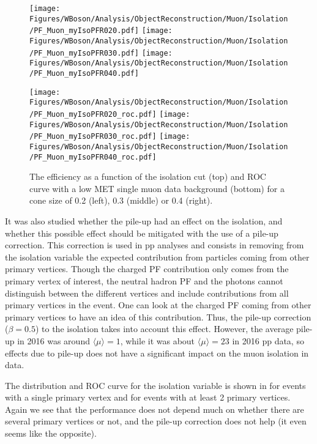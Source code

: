 \begin{figure}[htbp]
 
 \begin{center}
 \texttt{[image: Figures/WBoson/Analysis/ObjectReconstruction/Muon/Isolation/PF\_Muon\_myIsoPFR020.pdf]}
 \texttt{[image: Figures/WBoson/Analysis/ObjectReconstruction/Muon/Isolation/PF\_Muon\_myIsoPFR030.pdf]}
 \texttt{[image: Figures/WBoson/Analysis/ObjectReconstruction/Muon/Isolation/PF\_Muon\_myIsoPFR040.pdf]}
 
 \texttt{[image: Figures/WBoson/Analysis/ObjectReconstruction/Muon/Isolation/PF\_Muon\_myIsoPFR020\_roc.pdf]}
 \texttt{[image: Figures/WBoson/Analysis/ObjectReconstruction/Muon/Isolation/PF\_Muon\_myIsoPFR030\_roc.pdf]}
 \texttt{[image: Figures/WBoson/Analysis/ObjectReconstruction/Muon/Isolation/PF\_Muon\_myIsoPFR040\_roc.pdf]}
 \end{center}
 
 \caption{\label{fig:isoConesLowMET}The efficiency as a function of the isolation cut (top) and ROC curve with a low MET single muon data background (bottom) for a cone size of 0.2 (left), 0.3 (middle) or 0.4 (right).}
\end{figure}

It was also studied whether the pile-up had an effect on the isolation, and whether this possible effect should be mitigated with the use of a pile-up correction. This correction is used in pp analyses and consists in removing from the isolation variable the expected contribution from particles coming from other primary vertices. Though the charged PF contribution only comes from the primary vertex of interest, the neutral hadron PF and the photons cannot distinguish between the different vertices and include contributions from all primary vertices in the event. One can look at the charged PF coming from other primary vertices to have an idea of this contribution. Thus, the pile-up correction ($\beta=0.5$) to the isolation takes into account this effect. However, the average pile-up in 2016 \pPb was around $\langle\mu\rangle = 1$, while it was about $\langle\mu\rangle = 23$ in 2016 pp data, so effects due to pile-up does not have a significant impact on the muon isolation in \pPb data.

The distribution and ROC curve for the isolation variable is shown in  for events with a single primary vertex and  for events with at least 2 primary vertices.
Again we see that the performance does not depend much on whether there are several primary vertices or not, and the pile-up correction does not help (it even seems like the opposite).

